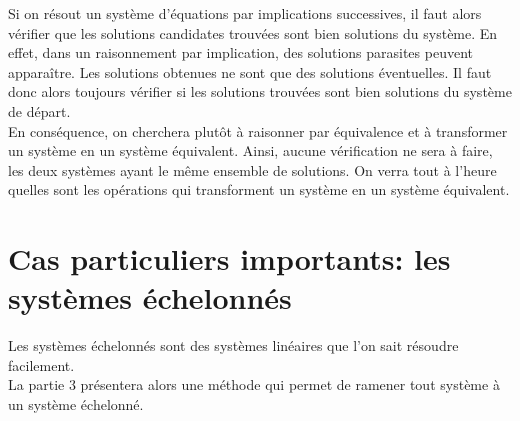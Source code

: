 \documentclass[a4paper, 11pt]{article}
\begin{document}
\begin{rem}
Si on r\'esout un syst\`eme d'\'equations par implications successives, il faut alors v\'erifier que les solutions candidates trouv\'ees sont bien solutions du syst\`eme. En effet, dans un raisonnement par implication, des solutions parasites peuvent appara\^itre. Les solutions obtenues ne sont que des solutions \'eventuelles. Il faut donc alors toujours v\'erifier si les solutions trouv\'ees sont bien solutions du syst\`eme de d\'epart.\\
En cons\'equence, on cherchera plut\^ot \`a raisonner par \'equivalence et \`a transformer un syst\`eme en un syst\`eme \'equivalent. Ainsi, aucune v\'erification ne sera \`a faire, les deux syst\`emes ayant le m\^eme ensemble de solutions. On verra tout \`a l'heure quelles sont les op\'erations qui transforment un syst\`eme en un syst\`eme \'equivalent. 
\end{rem}



\section{Cas particuliers importants: les syst\`{e}mes \'echelonn\'es}

\noindent Les syst\`{e}mes \'echelonn\'es sont des syst\`{e}mes lin\'eaires que l'on sait r\'esoudre facilement.\\
\noindent La partie 3 pr\'esentera alors une m\'ethode qui permet de ramener tout syst\`{e}me \`{a} un syst\`{e}me \'echelonn\'e.
\end{document}
